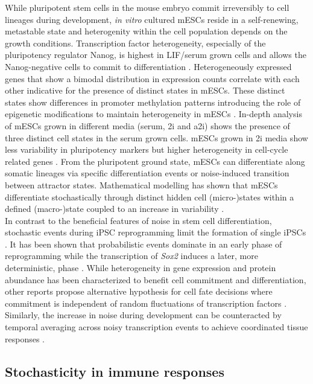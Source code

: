 While pluripotent stem cells in the mouse embryo commit irreversibly to cell lineages during development, \emph{in vitro} cultured \glspl{mESC} reside in a self-renewing, metastable state \citep{Hayashi2013} and heterogenity within the cell population depends on the growth conditions. Transcription factor heterogeneity, especially of the pluripotency regulator Nanog, is highest in \gls{LIF}/serum grown cells and allows the Nanog-negative cells to commit to differentiation \citep{Chickarmane2012, Torres-Padilla2014}. Heterogeneously expressed genes that show a bimodal distribution in expression counts correlate with each other indicative for the presence of distinct states in mESCs. These distinct states show differences in promoter methylation patterns introducing the role of epigenetic modifications to maintain heterogeneity in mESCs \citep{Singer2014a}. In-depth analysis of mESCs grown in different media (serum, \gls{2i} and \gls{a2i}) shows the presence of three distinct cell states in the serum grown cells. mESCs grown in 2i media show less variability in pluripotency markers but higher heterogeneity in cell-cycle related genes \citep{Kolodziejczyk2015cell}. From the pluripotent ground state, mESCs can differentiate along somatic lineages via specific differentiation events or noise-induced transition between attractor states. Mathematical modelling has shown that mESCs differentiate stochastically through distinct hidden cell (micro-)states within a defined (macro-)state coupled to an increase in variability \cite{Stumpf2017}.\\

In contrast to the beneficial features of noise in stem cell differentiation, stochastic events during \gls{iPSC} reprogramming limit the formation of single iPSCs \citep{Hanna2009, Yamanaka2009}. It has been shown that probabilistic events dominate in an early phase of reprogramming while the transcription of \textit{Sox2} induces a later, more deterministic, phase \cite{Buganim2012}. While heterogeneity in gene expression and protein abundance has been characterized to benefit cell commitment and differentiation, other reports propose alternative hypothesis for cell fate decisions where commitment is independent of random fluctuations of transcription factors \cite{Hoppe2016}. Similarly, the increase in noise during development can be counteracted by temporal averaging across noisy transcription events to achieve coordinated tissue responses \citep{Stapel2017}. 

\subsection{Stochasticity in immune responses}

